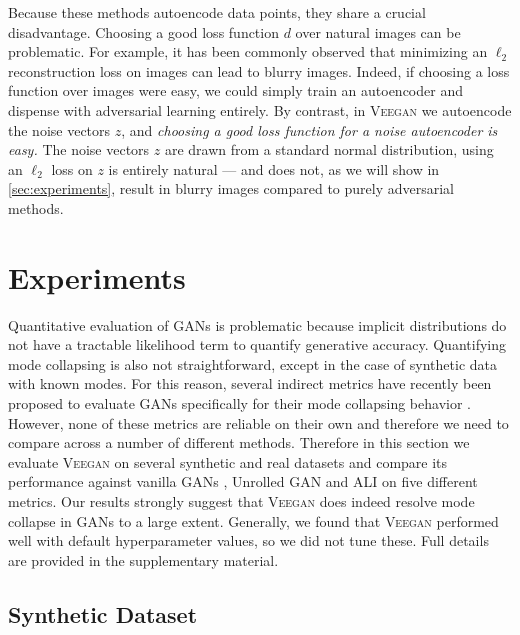 \documentclass{article}
\newcommand{\acronym}{\textsc{Veegan}\xspace}
\begin{document}
Because these methods autoencode data points,
they share a crucial disadvantage.
Choosing a good loss function $d$
over natural images can be problematic.
For example, it has been commonly observed that 
minimizing an $\ell_2$ reconstruction loss
on images can lead to blurry images.
Indeed, if choosing a loss function over images were easy,
we could simply train an autoencoder and dispense
with adversarial learning entirely.
By contrast,  in \acronym we autoencode the noise vectors $z$, and 
\emph{choosing a good loss function for a noise
autoencoder is easy.} The noise vectors $z$
are drawn from a standard normal distribution,
using an $\ell_2$ loss on $z$ is entirely natural
--- and does not, as we will show in \autoref{sec:experiments}, result in blurry images compared
to purely adversarial methods. 

\section{Experiments}\label{sec:experiments}

Quantitative evaluation of GANs is problematic because implicit distributions do not have a tractable likelihood term to quantify generative accuracy. Quantifying mode collapsing is also not straightforward, except  in the case of synthetic data with known modes. 
For this reason, several indirect metrics have recently been
proposed to evaluate GANs specifically for their mode collapsing behavior \citep{metz2016unrolled,Che2017ModeRG}. However, none of these metrics are reliable on their own and therefore 
we need to compare across a number of different methods.
Therefore in this section we evaluate \acronym on several synthetic and real datasets and compare its performance against vanilla GANs \citep{gan}, Unrolled GAN \citep{metz2016unrolled} and ALI \citep{ali2016} on five different metrics. Our results strongly suggest that \acronym does indeed resolve mode collapse in GANs
to a large extent. 
Generally, we found that \acronym performed well with default hyperparameter values, 
so we did not tune these.  Full details are provided in the supplementary material.

\subsection{Synthetic Dataset}
\end{document}
